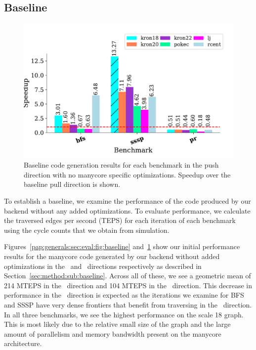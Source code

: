 \subsection{Baseline}
 
\begin{figure}[h]
    \centering
    \includegraphics[scale = 0.6]{graphit-figures/push.pdf}
    \caption{Baseline code generation results for each benchmark in the push direction with no manycore specific optimizations. Speedup over the baseline pull direction is shown.}
    \label{pap:generals:sec:eval:fig:push}
\end{figure}
To establish a baseline, we examine the performance of the code produced by our backend without any added optimizations.
To evaluate performance, we calculate the traversed edges per second (TEPS) for each iteration of each benchmark using the cycle counts that we obtain from simulation.

Figures~\ref{pap:generals:sec:eval:fig:baseline} and~\ref{pap:generals:sec:eval:fig:push} show our initial performance results for the manycore code generated by our backend without added optimizations in the \pull~and \push~directions respectively as described in Section~\ref{sec:method:sub:baseline}.
Across all of these, we see a geometric mean of 214 MTEPS in the \pull~direction and 104 MTEPS in the \push~direction. 
This decrease in performance in the \push~direction is expected as the iterations we examine for BFS and SSSP have very dense frontiers that benefit from traversing in the \pull~direction.
In all three benchmarks, we see the highest performance on the \kron scale 18 graph.
This is most likely due to the relative small size of the graph and the large amount of parallelism and memory bandwidth present on the manycore architecture.
 
